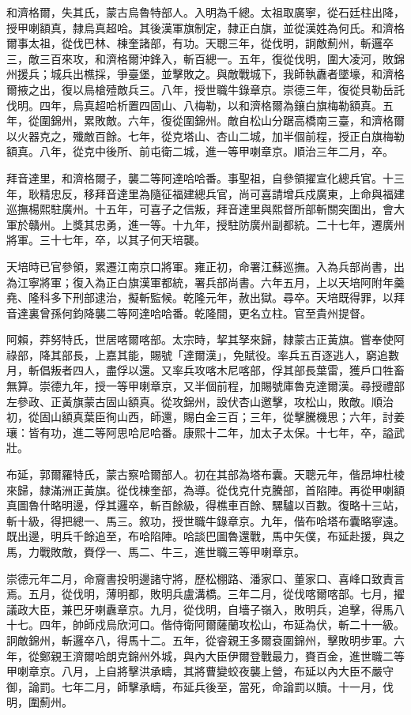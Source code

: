 \begin{pinyinscope}
和濟格爾，失其氏，蒙古烏魯特部人。入明為千總。太祖取廣寧，從石廷柱出降，授甲喇額真，隸烏真超哈。其後漢軍旗制定，隸正白旗，並從漢姓為何氏。和濟格爾事太祖，從伐巴林、棟奎諸部，有功。天聰三年，從伐明，詗敵薊州，斬邏卒三，敵三百來攻，和濟格爾沖鋒入，斬百總一。五年，復從伐明，圍大凌河，敗錦州援兵；城兵出樵採，爭臺堡，並擊敗之。與敵戰城下，我師執纛者墜壕，和濟格爾掖之出，復以鳥槍殪敵兵三。八年，授世職牛錄章京。崇德三年，復從貝勒岳託伐明。四年，烏真超哈析置四固山、八梅勒，以和濟格爾為鑲白旗梅勒額真。五年，從圍錦州，累敗敵。六年，復從圍錦州。敵自松山分踞高橋南三臺，和濟格爾以火器克之，殲敵百餘。七年，從克塔山、杏山二城，加半個前程，授正白旗梅勒額真。八年，從克中後所、前屯衛二城，進一等甲喇章京。順治三年二月，卒。

拜音達里，和濟格爾子，襲二等阿達哈哈番。事聖祖，自參領擢宣化總兵官。十三年，耿精忠反，移拜音達里為隨征福建總兵官，尚可喜請增兵戍廣東，上命與福建巡撫楊熙駐廣州。十五年，可喜子之信叛，拜音達里與熙督所部斬關突圍出，會大軍於贛州。上獎其忠勇，進一等。十九年，授駐防廣州副都統。二十七年，遷廣州將軍。三十七年，卒，以其子何天培襲。

天培時已官參領，累遷江南京口將軍。雍正初，命署江蘇巡撫。入為兵部尚書，出為江寧將軍；復入為正白旗漢軍都統，署兵部尚書。六年五月，上以天培阿附年羹堯、隆科多下刑部逮治，擬斬監候。乾隆元年，赦出獄。尋卒。天培既得罪，以拜音達裏曾孫何鈞降襲二等阿達哈哈番。乾隆間，更名立柱。官至貴州提督。

阿賴，莽努特氏，世居喀爾喀部。太宗時，挈其孥來歸，隸蒙古正黃旗。嘗奉使阿祿部，降其部長，上嘉其能，賜號「達爾漢」，免賦役。率兵五百逐逃人，窮追數月，斬倡叛者四人，盡俘以還。又率兵攻喀木尼喀部，俘其部長葉雷，獲戶口牲畜無算。崇德九年，授一等甲喇章京，又半個前程，加賜號庫魯克達爾漢。尋授禮部左參政、正黃旗蒙古固山額真。從攻錦州，設伏杏山邀擊，攻松山，敗敵。順治初，從固山額真葉臣徇山西，師還，賜白金三百；三年，從擊騰機思；六年，討姜瓖：皆有功，進二等阿思哈尼哈番。康熙十二年，加太子太保。十七年，卒，謚武壯。

布延，郭爾羅特氏，蒙古察哈爾部人。初在其部為塔布囊。天聰元年，偕昂坤杜棱來歸，隸滿洲正黃旗。從伐棟奎部，為導。從伐克什克騰部，首陷陣。再從甲喇額真圖魯什略明邊，俘其邏卒，斬百餘級，得樵車百餘、騾驢以百數。復略十三站，斬十級，得把總一、馬三。敘功，授世職牛錄章京。九年，偕布哈塔布囊略寧遠。既出邊，明兵千餘追至，布哈陷陣。哈談巴圖魯還戰，馬中矢僕，布延赴援，與之馬，力戰敗敵，賚俘一、馬二、牛三，進世職三等甲喇章京。

崇德元年二月，命齎書投明邊諸守將，歷松棚路、潘家口、董家口、喜峰口致責言焉。五月，從伐明，薄明都，敗明兵盧溝橋。三年二月，從伐喀爾喀部。七月，擢議政大臣，兼巴牙喇纛章京。九月，從伐明，自墻子嶺入，敗明兵，追擊，得馬八十七。四年，帥師戍烏欣河口。偕侍衛阿爾薩蘭攻松山，布延為伏，斬二十一級。詗敵錦州，斬邏卒八，得馬十二。五年，從睿親王多爾袞圍錦州，擊敗明步軍。六年，從鄭親王濟爾哈朗克錦州外城，與內大臣伊爾登戰最力，賚百金，進世職二等甲喇章京。八月，上自將擊洪承疇，其將曹變蛟夜襲上營，布延以內大臣不嚴守御，論罰。七年二月，師擊承疇，布延兵後至，當死，命論罰以贖。十一月，伐明，圍薊州。


\end{pinyinscope}
